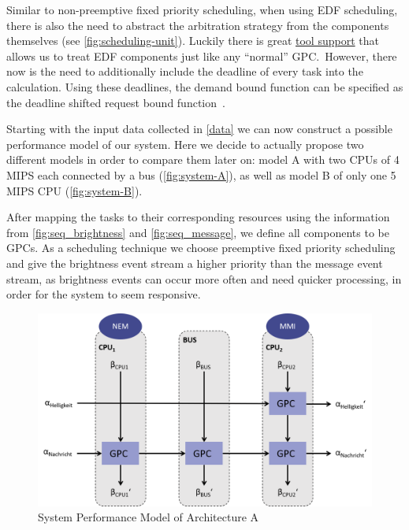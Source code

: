
Similar to non-preemptive fixed priority scheduling, when using EDF scheduling, there is also the need to abstract the arbitration strategy from the components themselves (see \autoref{fig:scheduling-unit}).
Luckily there is great \href{https://www.mpa.ethz.ch/}{tool support} that allows us to treat EDF components just like any ``normal'' GPC.\
However, there now is the need to additionally include the deadline of every task into the calculation.
Using these deadlines, the demand bound function can be specified as the deadline shifted request bound function~\cite{slo}.


Starting with the input data collected in \autoref{data} we can now construct a possible performance model of our system.
Here we decide to actually propose two different models in order to compare them later on: model A with two CPUs of 4 MIPS each connected by a bus (\autoref{fig:system-A}),
as well as model B of only one 5 MIPS CPU (\autoref{fig:system-B}).

After mapping the tasks to their corresponding resources using the information from \autoref{fig:seq_brightness} and \autoref{fig:seq_message}, we define all components to be GPCs.
As a scheduling technique we choose preemptive fixed priority scheduling and give the brightness event stream a higher priority than the
message event stream, as brightness events can occur more often and need quicker processing, in order for the system to seem responsive.

\begin{figure}
    \centering
    \includegraphics[width=\columnwidth]{graphics/system_A.png}
    \caption{System Performance Model of Architecture A}\label{fig:system-A}
\end{figure}

